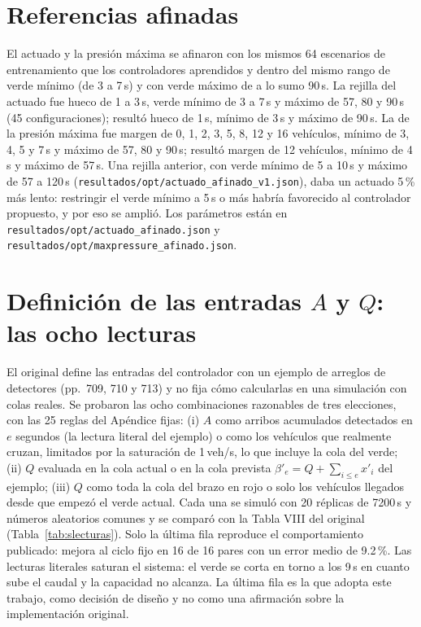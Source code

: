 \documentclass[journal]{IEEEtran}
\begin{document}
\section{Referencias afinadas}
\label{sec:s-ref}
El actuado y la presión máxima se afinaron con los mismos 64 escenarios de entrenamiento que los controladores aprendidos y dentro del mismo rango de verde mínimo (de 3 a 7\,s) y con verde máximo de a lo sumo 90\,s. La rejilla del actuado fue hueco de 1 a 3\,s, verde mínimo de 3 a 7\,s y máximo de 57, 80 y 90\,s (45 configuraciones); resultó hueco de 1\,s, mínimo de 3\,s y máximo de 90\,s. La de la presión máxima fue margen de 0, 1, 2, 3, 5, 8, 12 y 16 vehículos, mínimo de 3, 4, 5 y 7\,s y máximo de 57, 80 y 90\,s; resultó margen de 12 vehículos, mínimo de 4\,s y máximo de 57\,s. Una rejilla anterior, con verde mínimo de 5 a 10\,s y máximo de 57 a 120\,s (\texttt{resultados/opt/actuado\_afinado\_v1.json}), daba un actuado 5\,\% más lento: restringir el verde mínimo a 5\,s o más habría favorecido al controlador propuesto, y por eso se amplió. Los parámetros están en \texttt{resultados/opt/actuado\_afinado.json} y \texttt{resultados/opt/maxpressure\_afinado.json}.

\section{Definición de las entradas $A$ y $Q$: las ocho lecturas}
\label{sec:s-lecturas}
El original define las entradas del controlador con un ejemplo de arreglos de detectores (pp.~709, 710 y 713) y no fija cómo calcularlas en una simulación con colas reales. Se probaron las ocho combinaciones razonables de tres elecciones, con las 25 reglas del Apéndice fijas: (i) $A$ como arribos acumulados detectados en $e$ segundos (la lectura literal del ejemplo) o como los vehículos que realmente cruzan, limitados por la saturación de 1\,veh/s, lo que incluye la cola del verde; (ii) $Q$ evaluada en la cola actual o en la cola prevista $\beta'_e=Q+\sum_{i\le e}x'_i$ del ejemplo; (iii) $Q$ como toda la cola del brazo en rojo o solo los vehículos llegados desde que empezó el verde actual. Cada una se simuló con 20 réplicas de 7200\,s y números aleatorios comunes y se comparó con la Tabla VIII del original (Tabla~\ref{tab:slecturas}). Solo la última fila reproduce el comportamiento publicado: mejora al ciclo fijo en 16 de 16 pares con un error medio de 9.2\,\%. Las lecturas literales saturan el sistema: el verde se corta en torno a los 9\,s en cuanto sube el caudal y la capacidad no alcanza. La última fila es la que adopta este trabajo, como decisión de diseño y no como una afirmación sobre la implementación original.
\end{document}
